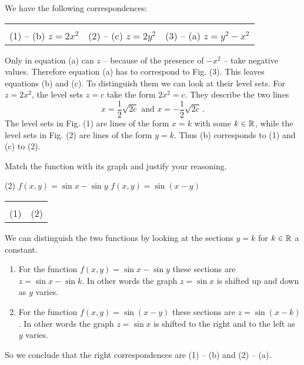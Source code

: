 \begin{solution}
We have the following correspondences:

\begin{center}
\begin{tabu} to \linewidth {X[1,c] X[1,c] X[1,c]}
 &
 &
 \\
(1) -- (b) $z = 2x^2$ & 
(2) -- (c) $z = 2y^2$ & 
(3) -- (a) $z = y^2 - x^2$
\end{tabu}
\end{center}

Only in equation (a) can $z$ -- because of the presence of $-x^2$ -- take negative values. Therefore equation (a) has to correspond to Fig. (3). This leaves equations (b) and (c). To distinguish them we can look at their level sets. For $z=2x^2$, the level sets $z=c$ take the form $2x^2 = c$. They describe the two lines
\[
x = \frac 12 \sqrt{2c} \text{ and } x = -\frac 12 \sqrt{2c}\,.
\]
The level sets in Fig. (1) are lines of the form $x=k$ with some $k \in {\mathbb R}$, while the level sets in Fig. (2) are lines of the form $y=k$. Thus (b) corresponds to (1) and (c) to (2).
\end{solution}

\begin{question}
Match the function with its graph and justify your reasoning.
\begin{tasks}(2)
\task
$f(x,y) = \sin x - \sin y$
\task
$f(x,y) = \sin (x-y)$
\end{tasks}

\begin{center}
\begin{tabu} to \linewidth {X[1,c] X[1,c]}
 &
 \\
(1) & 
(2)
\end{tabu}
\end{center}
\end{question}

\begin{solution}
We can distinguish the two functions by looking at the sections $y=k$ for $k \in {\mathbb R}$ a constant.
\begin{enumerate}
\item
For the function $f(x,y) = \sin x - \sin y$ these sections are $z = \sin x - \sin k$. In other words the graph $z = \sin x$ is shifted up and down as $y$ varies.
\item
For the function $f(x,y) = \sin(x-y)$ these sections are $z = \sin (x-k)$. In other words the graph $z = \sin x$ is shifted to the right and to the left as $y$ varies.
\end{enumerate}

So we conclude that the right correspondences are (1) -- (b) and (2) -- (a).
\end{solution}

